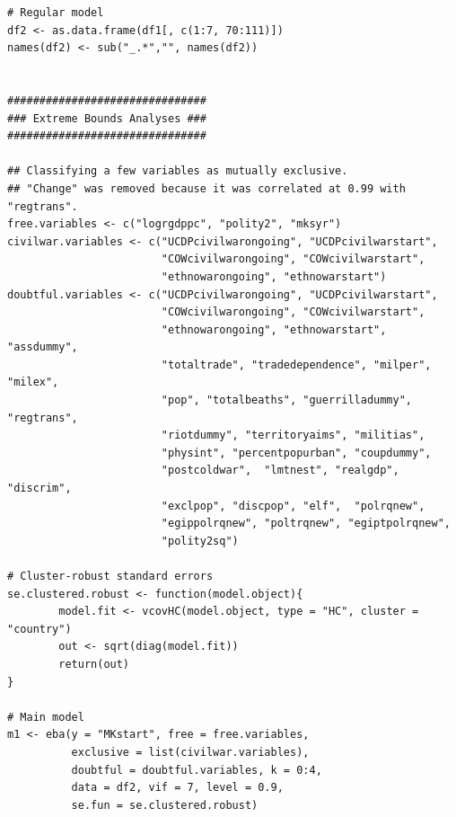 \documentclass[a4paper,12pt]{article}
\begin{document}
\begin{verbatim}
# Regular model
df2 <- as.data.frame(df1[, c(1:7, 70:111)])
names(df2) <- sub("_.*","", names(df2)) 


###############################
### Extreme Bounds Analyses ###
###############################

## Classifying a few variables as mutually exclusive.
## "Change" was removed because it was correlated at 0.99 with "regtrans". 
free.variables <- c("logrgdppc", "polity2", "mksyr")
civilwar.variables <- c("UCDPcivilwarongoing", "UCDPcivilwarstart",
                        "COWcivilwarongoing", "COWcivilwarstart",
                        "ethnowarongoing", "ethnowarstart")
doubtful.variables <- c("UCDPcivilwarongoing", "UCDPcivilwarstart",
                        "COWcivilwarongoing", "COWcivilwarstart",
                        "ethnowarongoing", "ethnowarstart", "assdummy",
                        "totaltrade", "tradedependence", "milper", "milex",
                        "pop", "totalbeaths", "guerrilladummy", "regtrans",
                        "riotdummy", "territoryaims", "militias",
                        "physint", "percentpopurban", "coupdummy",
                        "postcoldwar",  "lmtnest", "realgdp", "discrim",
                        "exclpop", "discpop", "elf",  "polrqnew",
                        "egippolrqnew", "poltrqnew", "egiptpolrqnew",
                        "polity2sq")

# Cluster-robust standard errors
se.clustered.robust <- function(model.object){
        model.fit <- vcovHC(model.object, type = "HC", cluster = "country")
        out <- sqrt(diag(model.fit))
        return(out)
}

# Main model
m1 <- eba(y = "MKstart", free = free.variables,
          exclusive = list(civilwar.variables),
          doubtful = doubtful.variables, k = 0:4,
          data = df2, vif = 7, level = 0.9,
          se.fun = se.clustered.robust)


\end{verbatim}
\end{document}
